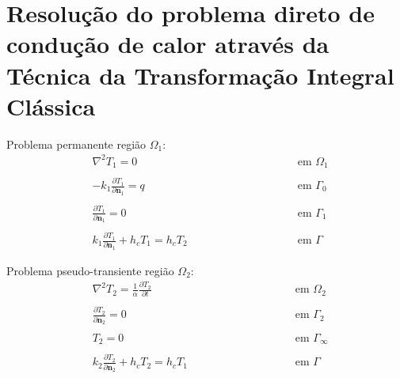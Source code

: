
\chapter{Resolução do problema direto de condução de calor através da Técnica da Transformação Integral Clássica}


Problema permanente região $\Omega_1$:
\begin{subequations}
	\begin{alignat}{2}
	& \nabla^2 T_1 = 0 \quad\quad\quad\quad\quad && \text{ em } \Omega_1 \label{harm_T1_trans} \\ \nonumber \\
	& -k_1 \frac{\partial T_1}{\partial\mathbf{n}_1} = q && \text{ em } \Gamma_0  \label{cc_T1_2_trans} \\ \nonumber \\
	& \frac{\partial T_1}{\partial \mathbf{n}_1} = 0 && \text{ em }  \Gamma_1 \label{cc_T1_1_trans} \\ \nonumber \\
	& k_1 \frac{\partial T_1}{\partial\mathbf{n}_1} + h_c T_1 = h_c T_2 \quad\quad\quad\quad\quad\quad\quad\quad && \text{ em }  \Gamma \label{cc_grad_T1_trans}
	\end{alignat}
\end{subequations}

Problema pseudo-transiente região $\Omega_2$:
\begin{subequations}
\begin{alignat}{2}
	& \nabla^2 T_2 = \frac{1}{\alpha}\frac{\partial T_2}{\partial t} \quad\quad\quad\quad\quad\quad\quad\quad\quad\quad\quad && \text{ em }  \Omega_2 \label{harm_T2_trans} \\ \nonumber \\
	& \frac{\partial T_2}{\partial \mathbf{n}_2} = 0 && \text{ em }  \Gamma_2 \label{cc_T1_3_trans} \\ \nonumber \\
	& T_2 = 0 && \text{ em }  \Gamma_\infty \label{cc_T1_4_trans} \\ \nonumber \\
	& k_2 \frac{\partial T_2}{\partial\mathbf{n}_2} + h_c T_2 = h_c T_1 && \text{ em }  \Gamma \label{cc_T1_5_trans}
	\end{alignat}
\end{subequations}

